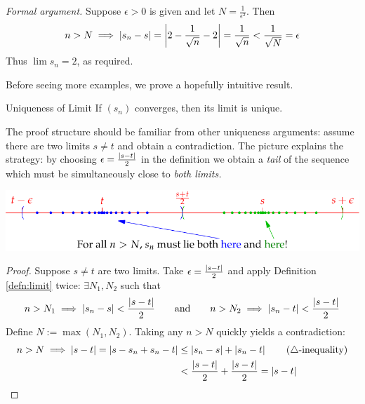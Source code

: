 \begin{example}{}{}
	\emph{Formal argument.}\quad
	Suppose $\epsilon>0$ is given and let $N=\frac 1{\epsilon^2}$. Then
	\[
		n>N\implies \left| s_n-s\right|=\left| 2-\frac 1{\sqrt n}-2\right| =\frac 1{\sqrt n}<\frac 1{\sqrt N}=\epsilon
	\]
	Thus $\lim s_n=2$, as required.
\end{example}


\goodbreak



% 

Before seeing more examples, we prove a hopefully intuitive result.

\begin{lemm}{Uniqueness of Limit}{}
	If $(s_n)$ converges, then its limit is unique.
\end{lemm}

The proof structure should be familiar from other uniqueness arguments: assume there are two limits $s\neq t$ and obtain a contradiction. The picture explains the strategy: by choosing $\epsilon=\frac{\left| s-t\right|}2$ in the definition we obtain a \emph{tail} of the sequence which must be simultaneously close to \emph{both limits.}
\begin{center}
	\includegraphics[scale=0.95]{limitunique}
\end{center}

\begin{proof}
	Suppose $s\neq t$ are two limits. Take $\epsilon=\frac{\left| s-t\right|}2$ and apply Definition \ref{defn:limit} twice: $\exists N_1,N_2$ such that
	\[
		n>N_1\implies \left| s_n-s\right|<\frac{\left| s-t\right|}2
		\qquad \text{and}\qquad 
		n>N_2\implies \left| s_n-t\right|<\frac{\left| s-t\right|}2
	\]
	Define $N:=\max(N_1,N_2)$. Taking any $n>N$ quickly yields a contradiction:
	\begin{align*}
		n>N\implies\left| s-t\right|=\left| s-s_n+s_n-t\right|
		&\le\left| s_n-s\right|+\left| s_n-t\right| \tag{$\triangle$-inequality}\\
		&<\frac{\left| s-t\right|}2+\frac{\left| s-t\right|}2 =\left| s-t\right| \tag*{\qedhere}
	\end{align*}
\end{proof}


